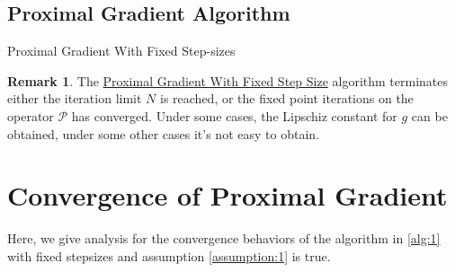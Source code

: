 \documentclass[]{article}
\theoremstyle{definition}
\newtheorem{remark}{Remark}[subsection]
{
    \newtheorem{assumption}{Assumption}
}
\begin{document}
    \subsection{Proximal Gradient Algorithm}
        \begin{algorithm}[H]
            \begin{algorithmic}[1]
                \ENDIF
            \ENDFOR
            \end{algorithmic}
            \caption{Proximal Gradient With Fixed Step-sizes}
            \label{alg:1}
        \end{algorithm}
        \begin{remark}
            The \hyperref[alg:1]{Proximal Gradient With Fixed Step Size} algorithm terminates either the iteration limit $N$ is reached, or the fixed point iterations on the operator $\mathcal P$ has converged. Under some cases, the Lipschiz constant for $g$ can be obtained, under some other cases it's not easy to obtain. 
        \end{remark}

\section{Convergence of Proximal Gradient}\label{sec:pg_convergence}
    Here, we give analysis for the convergence behaviors of the algorithm in \hyperref[alg:1]{\ref*{alg:1}} with fixed stepsizes and assumption \hyperref[assumption:1]{\ref*{assumption:1}} is true. 
\end{document}
